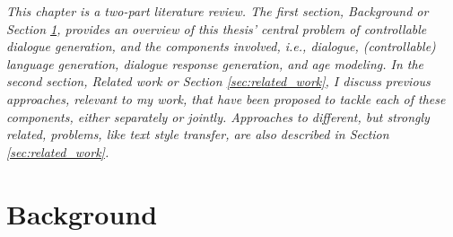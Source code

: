 
\textit{This chapter is a two-part literature review. The first section, Background or Section \ref{sec:background}, provides an overview of this thesis' central problem of controllable dialogue generation, and the components involved, i.e., dialogue, (controllable) language generation, dialogue response generation, and age modeling. In the second section, Related work or Section \ref{sec:related_work}, I discuss previous approaches, relevant to my work, that have been proposed to tackle each of these components, either separately or jointly. Approaches to different, but strongly related, problems, like text style transfer, are also described in Section \ref{sec:related_work}.} 

\section{Background}
\label{sec:background}



